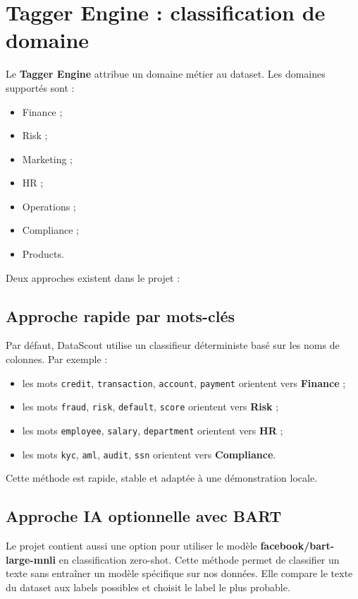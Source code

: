\documentclass[12pt,a4paper]{report}
\begin{document}
\section{Tagger Engine : classification de domaine}

Le \textbf{Tagger Engine} attribue un domaine métier au dataset. Les domaines supportés sont :

\begin{itemize}
    \item Finance ;
    \item Risk ;
    \item Marketing ;
    \item HR ;
    \item Operations ;
    \item Compliance ;
    \item Products.
\end{itemize}

Deux approches existent dans le projet :

\subsection{Approche rapide par mots-clés}

Par défaut, DataScout utilise un classifieur déterministe basé sur les noms de colonnes. Par exemple :

\begin{itemize}
    \item les mots \texttt{credit}, \texttt{transaction}, \texttt{account}, \texttt{payment} orientent vers \textbf{Finance} ;
    \item les mots \texttt{fraud}, \texttt{risk}, \texttt{default}, \texttt{score} orientent vers \textbf{Risk} ;
    \item les mots \texttt{employee}, \texttt{salary}, \texttt{department} orientent vers \textbf{HR} ;
    \item les mots \texttt{kyc}, \texttt{aml}, \texttt{audit}, \texttt{ssn} orientent vers \textbf{Compliance}.
\end{itemize}

Cette méthode est rapide, stable et adaptée à une démonstration locale.

\subsection{Approche IA optionnelle avec BART}

Le projet contient aussi une option pour utiliser le modèle \textbf{facebook/bart-large-mnli} en classification zero-shot. Cette méthode permet de classifier un texte sans entraîner un modèle spécifique sur nos données. Elle compare le texte du dataset aux labels possibles et choisit le label le plus probable.
\end{document}
